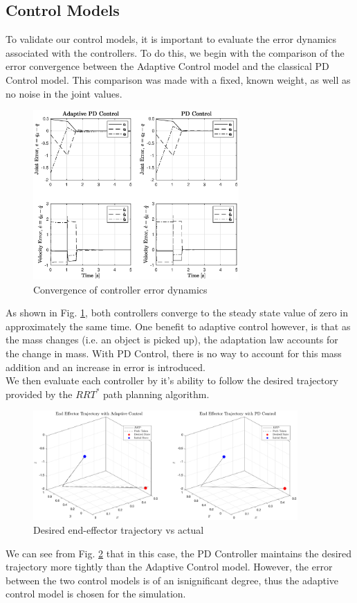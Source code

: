 \subsection*{Control Models}
To validate our control models, it is important to evaluate the error dynamics associated with the controllers. To do this, we begin with the comparison of the error convergence between the Adaptive Control model and the classical PD Control model. This comparison was made with a fixed, known weight, as well as no noise in the joint values.
\begin{figure}[H]
	\centering
	\includegraphics[width=0.7\textwidth]{figures/adpdErr.eps}
	\caption{Convergence of controller error dynamics}
	\label{fig:adpderr}
\end{figure}
As shown in Fig. \ref{fig:adpderr}, both controllers converge to the steady state value of zero in approximately the same time. One benefit to adaptive control however, is that as the mass changes (i.e. an object is picked up), the adaptation law accounts for the change in mass. With PD Control, there is no way to account for this mass addition and an increase in error is introduced.\\

We then evaluate each controller by it's ability to follow the desired trajectory provided by the $RRT^{*}$ path planning algorithm.
\begin{figure}[H]
	\centering
	\includegraphics[width=0.9\textwidth]{figures/eeTraj.eps}
	\caption{Desired end-effector trajectory vs actual}
	\label{fig:eetraj}
\end{figure}
We can see from Fig. \ref{fig:eetraj} that in this case, the PD Controller maintains the desired trajectory more tightly than the Adaptive Control model. However, the error between the two control models is of an isnignificant degree, thus the adaptive control model is chosen for the simulation.